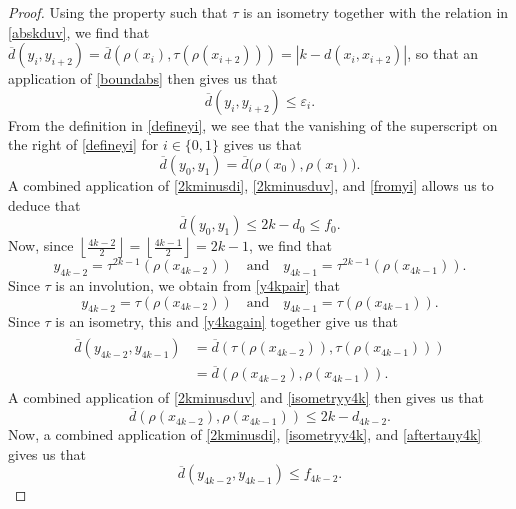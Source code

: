 \documentclass[12pt]{article}
\begin{document}
\begin{proof}
 Using the property such that $\tau$ is an isometry together with the relation in \eqref{abskduv}, we find that $\overline{d}(y_i, y_{i + 
 2}) = \overline{d}(\rho(x_i), \tau(\rho(x_{i+2})))  = |k - d(x_{i}, x_{i+2}) |$, so that an application of \eqref{boundabs} 
 then gives us that 
\begin{equation}\label{metricgaptwo}
 \overline{d}(y_{i}, y_{i+2}) \leq \varepsilon_{i}. 
\end{equation}
 From the definition in \eqref{defineyi}, we see that the vanishing of the superscript on the right of \eqref{defineyi} for $i \in \{ 0, 
 1 \}$ gives us that 
\begin{equation}\label{fromyi} 
 \overline{d}(y_0, y_1) = \overline{d}\big( \rho(x_0), \rho(x_1) \big). 
\end{equation}
 A combined application of \eqref{2kminusdi}, \eqref{2kminusduv}, and 
 \eqref{fromyi} allows us to deduce that 
\begin{equation}\label{firstendpoint}
 \overline{d}(y_0, y_1) \leq 2 k - d_0 \leq f_0. 
\end{equation}
Now, since
 $\left\lfloor \frac{4k-2}{2} \right\rfloor = \left\lfloor \frac{4k-1}{2} \right\rfloor = 2 k - 1$, 
 we find that 
\begin{equation}\label{y4kpair}
 y_{4k-2} = \tau^{2k-1}\left( \rho(x_{4k-2}) \right) \quad \text{and} \quad
 y_{4k-1} = \tau^{2k-1}\left( \rho(x_{4k-1}) \right). 
\end{equation}
 Since $\tau$ is an involution, we obtain from \eqref{y4kpair} that 
\begin{equation}\label{y4kagain}
 y_{4k-2} = \tau\left( \rho(x_{4k-2}) \right) \quad \text{and} \quad
 y_{4k-1} = \tau\left( \rho(x_{4k-1}) \right). 
\end{equation}
 Since $\tau$ is an isometry, this and \eqref{y4kagain} together give us that 
\begin{align}
\begin{split}
 \overline{d}(y_{4k-2}, y_{4k-1})
 & = \overline{d}(\tau(\rho(x_{4k-2})), \tau(\rho(x_{4k-1}))) \\
 & = \overline{d}(\rho(x_{4k-2}), \rho(x_{4k-1})). 
\end{split}\label{isometryy4k}
\end{align}
 A combined application of \eqref{2kminusduv} and \eqref{isometryy4k} then gives us that 
\begin{equation}\label{aftertauy4k}
 \overline{d}(\rho(x_{4k-2}), \rho(x_{4k-1})) \leq 2 k - d_{4k-2}. 
\end{equation}
 Now, a combined application of \eqref{2kminusdi}, \eqref{isometryy4k}, and \eqref{aftertauy4k} gives us that 
\begin{equation}\label{secondendpoint} 
 \overline{d}(y_{4k-2}, y_{4k-1}) \leq f_{4k-2}. 
\end{equation}


\end{proof}
\end{document}
